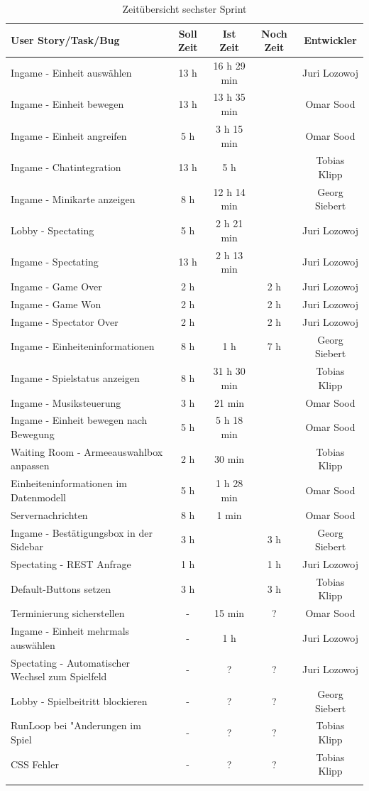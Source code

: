 \documentclass[12pt, titlepage]{scrartcl}
\begin{document}
    		\begin{longtable}[H]{p{6cm} c c c c }
    			\label{Time_2}
    			\textbf{User Story/Task/Bug} & \textbf{Soll Zeit} & \textbf{Ist Zeit} & \textbf{Noch Zeit} & \textbf{Entwickler} \\
    			\toprule
    			\endhead
    			Ingame - Einheit ausw\"ahlen & 13 h & 16 h 29 min &  & Juri Lozowoj \\
    			Ingame - Einheit bewegen & 13 h & 13 h 35 min &  & Omar Sood \\
    			Ingame - Einheit angreifen & 5 h & 3 h 15 min &  & Omar Sood \\
    			Ingame - Chatintegration & 13 h & 5 h &  & Tobias Klipp \\
    			Ingame - Minikarte anzeigen & 8 h & 12 h 14 min &  & Georg Siebert \\
    			Lobby - Spectating & 5 h & 2 h 21 min &  & Juri Lozowoj \\
    			Ingame - Spectating & 13 h & 2 h 13 min &  & Juri Lozowoj \\
    			Ingame - Game Over & 2 h &  & 2 h & Juri Lozowoj \\
    			Ingame - Game Won & 2 h &  & 2 h & Juri Lozowoj \\
    			Ingame - Spectator Over & 2 h &  & 2 h & Juri Lozowoj \\
    			Ingame - Einheiteninformationen & 8 h & 1 h & 7 h & Georg Siebert \\
    			Ingame - Spielstatus anzeigen & 8 h & 31 h 30 min &  & Tobias Klipp \\
    			Ingame - Musiksteuerung & 3 h & 21 min &  & Omar Sood \\
    			Ingame - Einheit bewegen nach Bewegung & 5 h & 5 h 18 min & & Omar Sood \\
    			\midrule
    			Waiting Room - Armeeauswahlbox anpassen & 2 h & 30 min & & Tobias Klipp \\
    			Einheiteninformationen im Datenmodell & 5 h & 1 h 28 min &  & Omar Sood \\
    			Servernachrichten & 8 h & 1 min &  & Omar Sood \\
    			Ingame - Best\"atigungsbox in der Sidebar & 3 h &  & 3 h & Georg Siebert \\
    			Spectating - REST Anfrage & 1 h &  & 1 h & Juri Lozowoj \\
    			Default-Buttons setzen & 3 h &  & 3 h & Tobias Klipp \\
    			\midrule
    			Terminierung sicherstellen & - & 15 min & ? & Omar Sood \\
    			Ingame - Einheit mehrmals ausw\"ahlen & - & 1 h &  & Juri Lozowoj \\
    			Spectating - Automatischer Wechsel zum Spielfeld & - & ? & ? & Juri Lozowoj \\
    			Lobby - Spielbeitritt blockieren & - & ? & ? & Georg Siebert \\
    			RunLoop bei "Anderungen im Spiel & - & ? & ? & Tobias Klipp \\
    			CSS Fehler & - & ? & ? & Tobias Klipp \\
    			\caption{Zeit\"ubersicht sechster Sprint}
    		\end{longtable}
\end{document}

